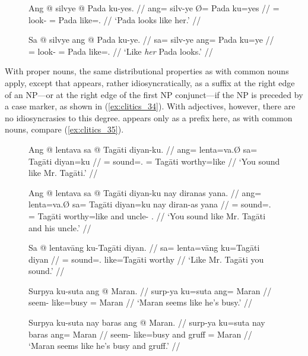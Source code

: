 \begin{figure}
\pex\label{ex:clitics_33}
\a\label{ex:clitics_33a}\begingl
	\gla Ang @ silvye {} @ Pada ku-yes. //
	\glb ang= silv-ye Ø= Pada ku=yes //
	\glc \AgtT{}= look-\TsgF{} \Top{}= Pada like=\TsgF{}.\Parg{} //
	\glft `Pada looks like her.' //
\endgl

\a\label{ex:clitics_33b}\begingl
	\gla Sa @ silvye ang @ Pada ku-ye. //
	\glb sa= silv-ye ang= Pada ku=ye //
	\glc \PatT{}= look-\TsgF{} \Aarg{}= Pada like=\TsgF{}.\Top{} //
	\glft `Like \emph{her} Pada looks.' //
\endgl
\xe
\end{figure}

With proper nouns, the same distributional properties as with common nouns
apply, except that  appears, rather idiosyncratically, as a
suffix at the right edge of an NP---or at the right edge of the first NP
conjunct---if the NP is preceded by a case marker, as shown in
(\ref{ex:clitics_34}). \label{clitics_preadj_ku} With adjectives, however,
there are no idiosyncrasies to this degree.  appears only as a
prefix here, as with common nouns, compare (\ref{ex:clitics_35}).

\begin{figure}
\pex\label{ex:clitics_34}
\a\label{ex:clitics_34a}\begingl
	\gla Ang @ lentava sa @ Tagāti diyan-ku. //
	\glb ang= lenta=va.Ø sa= Tagāti diyan=ku //
	\glc \AgtT{}= sound=\Second{}.\Top{} \Parg{}= Tagāti worthy=like //
	\glft `You sound like Mr. Tagāti.' //
\endgl

\a\label{ex:clitics_34b}\begingl
	\gla Ang @ lentava sa @ Tagāti diyan-ku nay diranas yana. //
	\glb ang= lenta=va.Ø sa= Tagāti diyan=ku nay diran-as yana //
	\glc \AgtT{}= sound=\Second{}.\Top{} \Parg{}= Tagāti worthy=like and 
		uncle-\Parg{} \TsgM{}.\Gen{} //
	\glft `You sound like Mr. Tagāti and his uncle.' //
\endgl

\a\label{ex:clitics_34c}\begingl
	\gla Sa @ lentavāng ku-​Tagāti diyan. //
	\glb sa= lenta=vāng ku=​Tagāti diyan //
	\glc \PatT{}= sound=\Second{}.\Aarg{} like=​Tagāti worthy //
	\glft `Like Mr. Tagāti you sound.' //
\endgl
\xe
\end{figure}

\begin{figure}
\pex\label{ex:clitics_35}
\a\label{ex:clitics_35a}\begingl
	\gla Surpya ku-suta ang @ Maran. //
	\glb surp-ya ku=suta ang= Maran //
	\glc seem-\TsgM{} like=busy \Aarg{}= Maran //
	\glft `Maran seems like he's busy.' //
\endgl

\a\label{ex:clitics_35b}\begingl
	\gla Surpya ku-suta nay baras ang @ Maran. //
	\glb surp-ya ku=suta nay baras ang= Maran //
	\glc seem-\TsgM{} like=busy and gruff \Aarg{}= Maran //
	\glft `Maran seems like he's busy and gruff.' //
\endgl
\xe
\end{figure}

